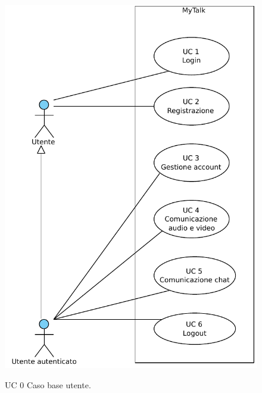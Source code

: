 \begin{figure}[htbp]
\centering
\includegraphics[scale=0.7]{./casi_uso/UC0.pdf}
\label{figUC0}
\caption{UC 0 Caso base utente.}
\end{figure}


